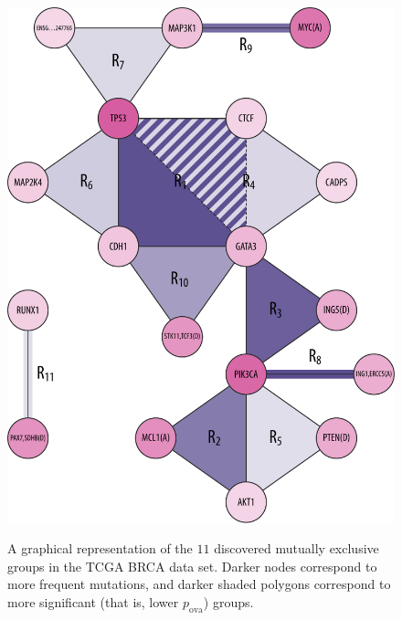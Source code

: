 \begin{figure}[htbp]
\centering
\includegraphics[width=\textwidth]{figures/genes/graph_brca.pdf}\\[2em]
\caption{A graphical representation of the $11$ discovered mutually exclusive groups in the TCGA BRCA data set.
Darker nodes correspond to more frequent mutations, and darker shaded polygons correspond to more significant (that is, lower $p_{\mathrm{ova}}$) groups.}
\label{fig:graph_brca}
\end{figure}

